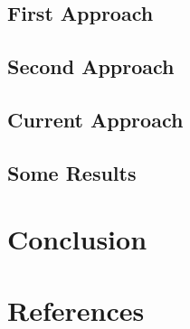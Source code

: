 \documentclass[aspectratio=169]{beamer}
\begin{document}
\subsection{First Approach}


\subsection{Second Approach}


\subsection{Current Approach}

\subsection{Some Results}


\section{Conclusion}



\section*{References}

\end{document}
